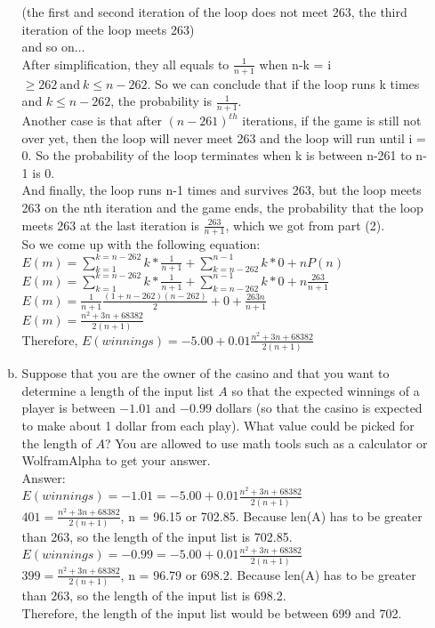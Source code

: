 \documentclass{assignment-263}
\begin{document}
\begin{enumerate}
\begin{enumerate}[(a)]
(the first and second iteration of the loop does not meet 263, the third iteration of the loop meets 263)\\ and so on...\\
After simplification, they all equals to $\frac{1}{n+1}$ when n-k = i $\geq 262 \ \text{and}\ k \leq n - 262$. So we can conclude that if the loop runs k times and $k \leq n - 262$, the probability is $\frac{1}{n+1}$.\\
Another case is that after $(n - 261)^{th}$ iterations, if the game is still not over yet, then the loop will never meet 263 and the loop will run until i = 0. So the probability of the loop terminates when k is between n-261 to n-1 is 0.\\
And finally, the loop runs n-1 times and survives 263, but the loop meets 263 on the nth iteration and the game ends, the probability that the loop meets 263 at the last iteration is $\frac{263}{n+1}$, which we got from part (2).\\
So we come up with the following equation:\\
$E(m) = \sum_{k=1}^{k=n-262}k*\frac{1}{n+1} + \sum_{k=n-262}^{n-1}k*0 + nP(n)$\\
$E(m) = \sum_{k=1}^{k=n-262}k*\frac{1}{n+1} + \sum_{k=n-262}^{n-1}k*0 + n\frac{263}{n+1}$\\
$E(m) = \frac{1}{n+1}\frac{(1+n-262)(n-262)}{2} + 0 + \frac{263n}{n+1} $\\
$E(m) = \frac{n^2+3n+68382}{2(n+1)} $\\
Therefore, $E(winnings) = -5.00+0.01\frac{n^2+3n+68382}{2(n+1)}$\\

			\item Suppose that you are the owner of the casino and that you want to
				determine a length of the input list $A$ so that the
				expected winnings of a player is between $-1.01$ and $-0.99$
				dollars (so that the casino is expected to make about 1
				dollar from each play). What value could be picked for the
				length of $A$? You are allowed to use math tools such as a
				calculator or WolframAlpha to get your answer.\\
Answer:\\
$E(winnings) = -1.01 =  -5.00+0.01\frac{n^2+3n+68382}{2(n+1)}$\\
$401 = \frac{n^2+3n+68382}{2(n+1)}$, n = 96.15 or 702.85. Because len(A) has to be greater than 263, so the length of the input list is 702.85.\\
$E(winnings) = -0.99 =  -5.00+0.01\frac{n^2+3n+68382}{2(n+1)}$\\
$399 = \frac{n^2+3n+68382}{2(n+1)}$, n = 96.79 or 698.2. Because len(A) has to be greater than 263, so the length of the input list is 698.2.\\
Therefore, the length of the input list would be between 699 and 702.\\

		\end{enumerate}

	\end{enumerate}
\end{document}

